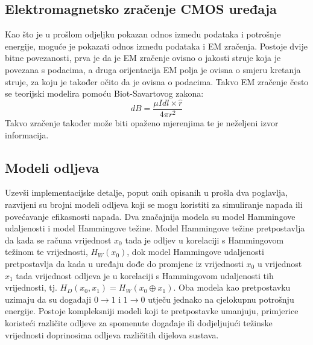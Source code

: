 \documentclass[times, utf8, diplomski]{fer}
\begin{document}
\subsection{Elektromagnetsko zračenje CMOS uređaja}
Kao što je u prošlom odjeljku pokazan odnos između podataka i potrošnje energije, moguće je pokazati odnos između podataka i EM zračenja. Postoje dvije bitne povezanosti, prva je da je EM zračenje ovisno o jakosti struje koja je povezana s podacima, a druga orijentacija EM polja je ovisna o smjeru kretanja struje, za koju je također očito da je ovisna o podacima. Takvo EM zračenje često se teorijski modelira pomoću Biot-Savartovog zakona:
\begin{equation}
    dB = \frac{\mu I dl \times \hat{r}}{4 \pi r^2}
\end{equation}
Takvo zračenje također može biti opaženo mjerenjima te je neželjeni izvor informacija.

\subsection{Modeli odljeva}

Uzevši implementacijske detalje, poput onih opisanih u prošla dva poglavlja, razvijeni su brojni modeli odljeva koji se mogu koristiti za simuliranje napada ili povećavanje efikasnosti napada. Dva značajnija modela su model Hammingove udaljenosti i model Hammingove težine. Model Hammingove težine pretpostavlja da kada se računa vrijednost \(x_0\) tada je odljev u korelaciji s Hammingovom težinom te vrijednosti, \(H_W(x_0)\), dok model Hammingove udaljenosti pretpostavlja da kada u uređaju dođe do promjene iz vrijednosti \(x_0\) u vrijednost \(x_1\) tada vrijednost odljeva je u korelaciji s Hammingovom udaljenosti tih vrijednosti, tj. \(H_D(x_0, x_1) = H_W(x_0 \oplus x_1)\). Oba modela kao pretpostavku uzimaju da su događaji \(0 \rightarrow 1\) i \(1 \rightarrow 0\) utječu jednako na cjelokupnu potrošnju energije. Postoje kompleksniji modeli koji te pretpostavke umanjuju, primjerice koristeći različite odljeve za spomenute događaje ili dodjeljujući težinske vrijednosti doprinosima odljeva različitih dijelova sustava.
\end{document}
